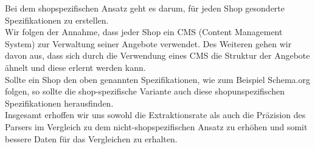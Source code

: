 Bei dem shopspezifischen Ansatz geht es darum, für jeden Shop gesonderte Spezifikationen zu erstellen. \\
Wir folgen der Annahme, dass jeder Shop ein CMS (Content Management System) zur Verwaltung seiner Angebote verwendet. Des Weiteren gehen wir davon aus, dass sich durch die Verwendung eines CMS die Struktur der Angebote ähnelt und diese erlernt werden kann.\\
Sollte ein Shop den oben genannten Spezifikationen, wie zum Beispiel Schema.org folgen, so sollte die shop-spezifische Variante auch diese shopunspezifischen Spezifikationen herausfinden.\\
Insgesamt erhoffen wir uns sowohl die Extraktionsrate als auch die Präzision des Parsers im Vergleich zu dem nicht-shopspezifischen Ansatz zu erhöhen und somit bessere Daten für das Vergleichen zu erhalten.